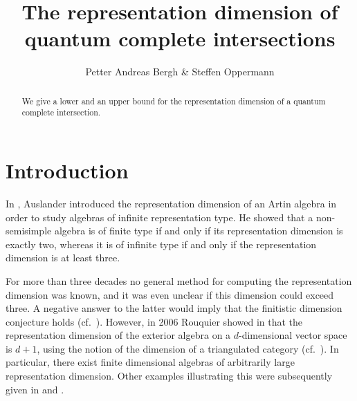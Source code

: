 \documentclass[a4paper]{amsart}
\theoremstyle{definition}
\theoremstyle{definition}
\theoremstyle{definition}
\theoremstyle{definition}
\theoremstyle{definition}
\theoremstyle{definition}
\theoremstyle{remark}
\theoremstyle{remark}
\theoremstyle{definition}
\theoremstyle{definition}
\begin{document}
\title{The representation dimension of quantum complete intersections}
\author{Petter Andreas Bergh \& Steffen Oppermann}
\address{Petter Andreas Bergh \newline Institutt for matematiske fag \\
  NTNU \\ N-7491 Trondheim \\ Norway}
\address{Steffen Oppermann \newline Institutt for matematiske fag \\
  NTNU \\ N-7491 Trondheim \\ Norway}



\maketitle

\begin{abstract}
We give a lower and an upper bound for the representation dimension
of a quantum complete intersection.
\end{abstract}

\section{Introduction}\label{intro}

In \cite{Auslander1}, Auslander introduced the representation
dimension of an Artin algebra in order to study algebras of infinite
representation type. He showed that a non-semisimple algebra is of
finite type if and only if its representation dimension is exactly
two, whereas it is of infinite type if and only if the
representation dimension is at least three.

For more than three decades no general method for computing the
representation dimension was known, and it was even unclear if this
dimension could exceed three. A negative answer to the latter would
imply that the finitistic dimension conjecture holds (cf.\
\cite{Igusa}). However, in 2006 Rouquier showed in \cite{Rouquier2}
that the representation dimension of the exterior algebra on a
$d$-dimensional vector space is $d+1$, using the notion of the
dimension of a triangulated category (cf.\ \cite{Rouquier1}). In
particular, there exist finite dimensional algebras of arbitrarily
large representation dimension. Other examples illustrating this
were subsequently given in \cite{Krause} and \cite{Oppermann1}.
\end{document}

